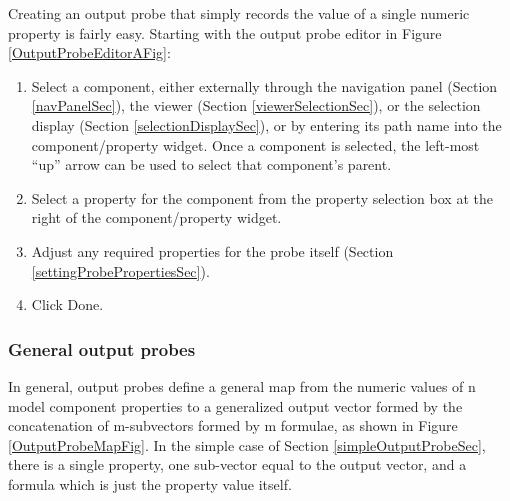 \documentclass{article}
\begin{document}
Creating an output probe that simply records the value of a single
numeric property is fairly easy. Starting with the output
probe editor in Figure \ref{OutputProbeEditorAFig}:

\begin{enumerate}

\item Select a component, either externally through the navigation panel
(Section \ref{navPanelSec}), the viewer 
(Section \ref{viewerSelectionSec}), or the selection
display (Section \ref{selectionDisplaySec}), or by entering its path name into the
component/property widget. Once a component is selected,
the left-most ``up'' arrow can be used to select that
component's parent.

\item Select a property for the component from the property
selection box at the right of the component/property widget.

\item Adjust any required properties for the probe itself 
(Section \ref{settingProbePropertiesSec}).

\item Click {\sf Done}.

\end{enumerate}

\subsubsection{General output probes}

In general, output probes define a general map from the numeric values
of n model component properties to a generalized output vector formed by the
concatenation of m-subvectors formed by m formulae, as shown
in Figure \ref{OutputProbeMapFig}. In the simple case of 
Section \ref{simpleOutputProbeSec},
there is a single property, one sub-vector equal to the output
vector, and a formula which is just the property value itself.
\end{document}
